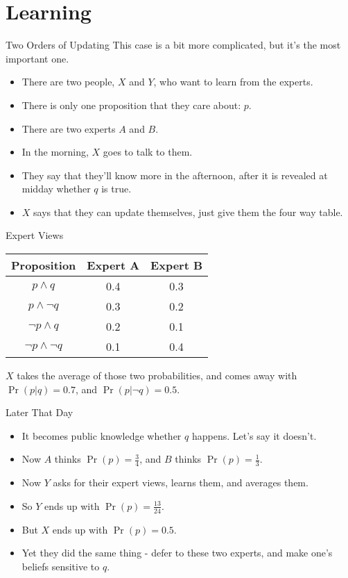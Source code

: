 \documentclass[
  ignorenonframetext,
]{beamer}
\providecommand{\tightlist}{%
  \setlength{\itemsep}{0pt}\setlength{\parskip}{0pt}}
\begin{document}
\hypertarget{learning}{%
\section{Learning}\label{learning}}

\begin{frame}{Two Orders of Updating}
\protect\hypertarget{two-orders-of-updating}{}
This case is a bit more complicated, but it's the most important one.

\begin{itemize}
\tightlist
\item
  There are two people, \(X\) and \(Y\), who want to learn from the
  experts.
\item
  There is only one proposition that they care about: \(p\).
\item
  There are two experts \(A\) and \(B\).
\item
  In the morning, \(X\) goes to talk to them.
\item
  They say that they'll know more in the afternoon, after it is revealed
  at midday whether \(q\) is true.
\item
  \(X\) says that they can update themselves, just give them the four
  way table.
\end{itemize}
\end{frame}

\begin{frame}{Expert Views}
\protect\hypertarget{expert-views}{}
\begin{longtable}[]{@{}ccc@{}}
\toprule
Proposition & Expert A & Expert B \\
\midrule
\endhead
\(p \wedge q\) & 0.4 & 0.3 \\
\(p \wedge \neg q\) & 0.3 & 0.2 \\
\(\neg p \wedge q\) & 0.2 & 0.1 \\
\(\neg p \wedge \neg q\) & 0.1 & 0.4 \\
\bottomrule
\end{longtable}

\(X\) takes the average of those two probabilities, and comes away with
\(\Pr(p | q) = 0.7\), and \(\Pr(p | \neg q) = 0.5\).
\end{frame}

\begin{frame}{Later That Day}
\protect\hypertarget{later-that-day}{}
\begin{itemize}
\tightlist
\item
  It becomes public knowledge whether \(q\) happens. Let's say it
  doesn't.
\item
  Now \(A\) thinks \(\Pr(p) = \frac{3}{4}\), and \(B\) thinks
  \(\Pr(p) = \frac{1}{3}\).
\item
  Now \(Y\) asks for their expert views, learns them, and averages them.
\item
  So \(Y\) ends up with \(\Pr(p) = \frac{13}{24}\).
\item
  But \(X\) ends up with \(\Pr(p) = 0.5\).
\item
  Yet they did the same thing - defer to these two experts, and make
  one's beliefs sensitive to \(q\).
\end{itemize}
\end{frame}
\end{document}
